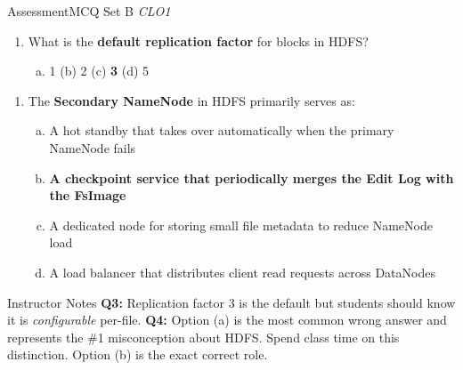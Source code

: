 \documentclass[aspectratio=169,10pt]{beamer}
\begin{document}
\begin{frame}{Assessment\textemdash MCQ Set B \hfill\small\textit{CLO1}}
  \vspace{6pt}
  \begin{enumerate}[\textbf{Q3.}]
    \item What is the \textbf{default replication factor} for blocks in HDFS?
    \begin{enumerate}[(a)]
      \item 1 \quad (b) 2 \quad (c) \textbf{3} \quad (d) 5
    \end{enumerate}
  \end{enumerate}
  \vspace{8pt}
  \begin{enumerate}[\textbf{Q4.}]
    \item The \textbf{Secondary NameNode} in HDFS primarily serves as:
    \begin{enumerate}[(a)]
      \item A hot standby that takes over automatically when the primary NameNode fails
      \item \textbf{A checkpoint service that periodically merges the Edit Log with the FsImage}
      \item A dedicated node for storing small file metadata to reduce NameNode load
      \item A load balancer that distributes client read requests across DataNodes
    \end{enumerate}
  \end{enumerate}
  \vspace{8pt}
  \begin{alertblock}{Instructor Notes}
    \textbf{Q3:} Replication factor 3 is the default but students should know it is \emph{configurable} per-file.  \textbf{Q4:} Option (a) is the most common wrong answer and represents the \#1 misconception about HDFS.  Spend class time on this distinction.  Option (b) is the exact correct role.
  \end{alertblock}
\end{frame}
\end{document}
